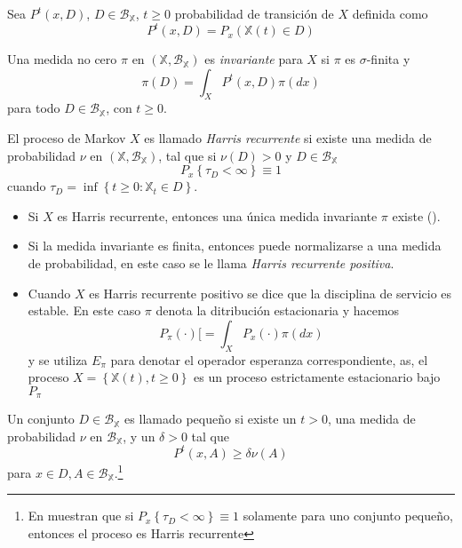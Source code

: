 Sea $P^{t}\left(x,D\right)$, $D\in\mathcal{B}_{\mathbb{X}}$,
$t\geq0$ probabilidad de transici\'on de $X$ definida como
\[P^{t}\left(x,D\right)=P_{x}\left(\mathbb{X}\left(t\right)\in
D\right)\]

\begin{Def}
Una medida no cero $\pi$ en
$\left(\mathbb{X},\mathcal{B}_{\mathbb{X}}\right)$ es {\em
invariante} para $X$ si $\pi$ es $\sigma$-finita y
\[\pi\left(D\right)=\int_{X}P^{t}\left(x,D\right)\pi\left(dx\right)\]
para todo $D\in \mathcal{B}_{\mathbb{X}}$, con $t\geq0$.
\end{Def}

\begin{Def}
El proceso de Markov $X$ es llamado {\em Harris recurrente} si
existe una medida de probabilidad $\nu$ en
$\left(\mathbb{X},\mathcal{B}_{\mathbb{X}}\right)$, tal que si
$\nu\left(D\right)>0$ y $D\in\mathcal{B}_{\mathbb{X}}$
\[P_{x}\left\{\tau_{D}<\infty\right\}\equiv1\] cuando
$\tau_{D}=\inf\left\{t\geq0:\mathbb{X}_{t}\in D\right\}$.
\end{Def}

\begin{itemize}
\item Si $X$ es Harris recurrente, entonces una \'unica medida
invariante $\pi$ existe (\cite{Getoor}). \item Si la medida
invariante es finita, entonces puede normalizarse a una medida de
probabilidad, en este caso se le llama {\em Harris recurrente
positiva}. \item Cuando $X$ es Harris recurrente positivo se dice
que la disciplina de servicio es estable. En este caso $\pi$
denota la ditribuci\'on estacionaria y hacemos
\[P_{\pi}\left(\cdot\right)[=\int_{X}P_{x}\left(\cdot\right)\pi\left(dx\right)\]
y se utiliza $E_{\pi}$ para denotar el operador esperanza
correspondiente, as, el proceso
$X=\left\{\mathbb{X}\left(t\right),t\geq0\right\}$ es un proceso
estrictamente estacionario bajo $P_{\pi}$
\end{itemize}

\begin{Def}
Un conjunto $D\in\mathcal{B}_\mathbb{X}$ es llamado peque\~no si
existe un $t>0$, una medida de probabilidad $\nu$ en
$\mathcal{B}_\mathbb{X}$, y un $\delta>0$ tal que
\[P^{t}\left(x,A\right)\geq\delta\nu\left(A\right)\] para $x\in
D,A\in\mathcal{B}_\mathbb{X}$.\footnote{En \cite{MeynTweedie}
muestran que si $P_{x}\left\{\tau_{D}<\infty\right\}\equiv1$
solamente para uno conjunto peque\~no, entonces el proceso es
Harris recurrente}
\end{Def}

